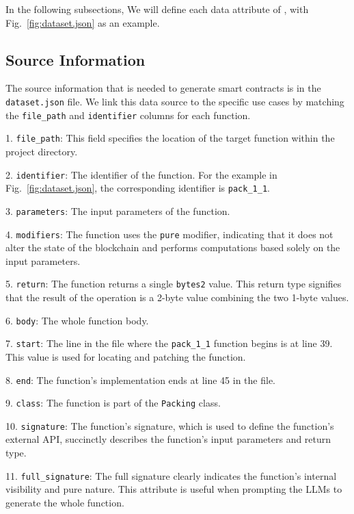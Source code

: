 In the following subsections, We will define each data attribute of \datasetname, with Fig.~\ref{fig:dataset.json} as an example.




\subsection{Source Information}

The source information that is needed to generate smart contracts is in the \texttt{dataset.json} file. We link this data source to the specific use cases by matching the \texttt{file\_path} and \texttt{identifier} columns for each function.

1. \texttt{file\_path}: This field specifies the location of the target function within the project directory. 

2. \texttt{identifier}: The identifier of the function. For the example in Fig.~\ref{fig:dataset.json}, the corresponding identifier is \texttt{pack\_1\_1}. 

3. \texttt{parameters}: The input parameters of the function.

4. \texttt{modifiers}: The function uses the \texttt{pure} modifier, indicating that it does not alter the state of the blockchain and performs computations based solely on the input parameters.

5. \texttt{return}: The function returns a single \texttt{bytes2} value. This return type signifies that the result of the operation is a 2-byte value combining the two 1-byte values.

6. \texttt{body}: The whole function body.

7. \texttt{start}: The line in the file where the \texttt{pack\_1\_1} function begins is at line 39. This value is used for locating and patching the function.

8. \texttt{end}: The function's implementation ends at line 45 in the file.

9. \texttt{class}: The function is part of the \texttt{Packing} class.

10. \texttt{signature}: The function's signature, which is used to define the function's external API, succinctly describes the function's input parameters and return type.

11. \texttt{full\_signature}: The full signature clearly indicates the function's internal visibility and pure nature. This attribute is useful when prompting the LLMs to generate the whole function.

